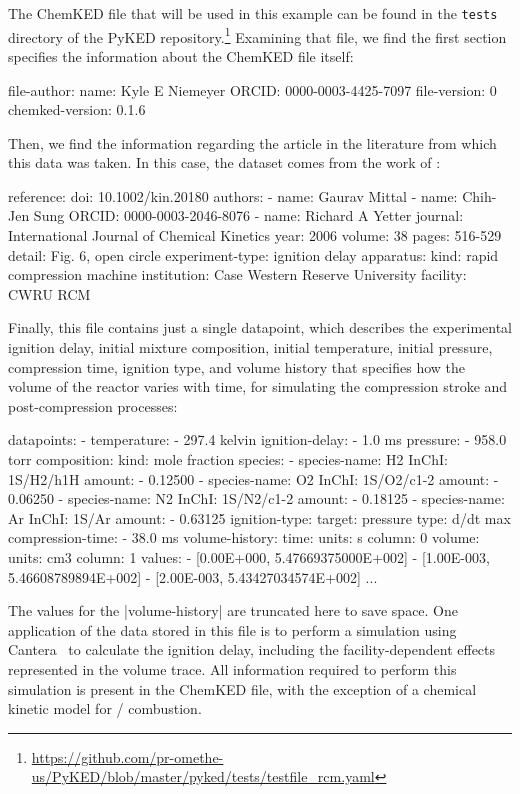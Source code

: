 \documentclass[12pt]{ijck}
\newcommand\ck{ChemKED}
\newcommand\pk{PyKED}
\begin{document}
The \ck{} file that will be used in this example can be found in the
\texttt{tests} directory of the \pk{}
repository.\footnote{\url{https://github.com/pr-omethe-us/PyKED/blob/master/pyked/tests/testfile_rcm.yaml}}
Examining that file, we find the first section specifies the information about
the \ck{} file itself:
%
\begin{yamlbox}
file-author:
  name: Kyle E Niemeyer
  ORCID: 0000-0003-4425-7097
file-version: 0
chemked-version: 0.1.6
\end{yamlbox}
%
Then, we find the information regarding the article in the literature from which
this data was taken. In this case, the dataset comes from the work of
\textcite{Mittal2006a}:
\begin{yamlbox}
reference:
  doi: 10.1002/kin.20180
  authors:
    - name: Gaurav Mittal
    - name: Chih-Jen Sung
      ORCID: 0000-0003-2046-8076
    - name: Richard A Yetter
  journal: International Journal of Chemical Kinetics
  year: 2006
  volume: 38
  pages: 516-529
  detail: Fig. 6, open circle
experiment-type: ignition delay
apparatus:
  kind: rapid compression machine
  institution: Case Western Reserve University
  facility: CWRU RCM
\end{yamlbox}
%
Finally, this file contains just a single datapoint, which describes the experimental
ignition delay, initial mixture composition, initial temperature, initial pressure,
compression time, ignition type, and volume history that specifies
how the volume of the reactor varies with time, for simulating the compression
stroke and post-compression processes:
%
\begin{yamlbox}
datapoints:
- temperature:
    - 297.4 kelvin
  ignition-delay:
    - 1.0 ms
  pressure:
    - 958.0 torr
  composition:
    kind: mole fraction
    species:
      - species-name: H2
        InChI: 1S/H2/h1H
        amount:
          - 0.12500
      - species-name: O2
        InChI: 1S/O2/c1-2
        amount:
          - 0.06250
      - species-name: N2
        InChI: 1S/N2/c1-2
        amount:
          - 0.18125
      - species-name: Ar
        InChI: 1S/Ar
        amount:
          - 0.63125
  ignition-type:
    target: pressure
    type: d/dt max
  compression-time:
    - 38.0 ms
  volume-history:
    time:
      units: s
      column: 0
    volume:
      units: cm3
      column: 1
    values:
      - [0.00E+000, 5.47669375000E+002]
      - [1.00E-003, 5.46608789894E+002]
      - [2.00E-003, 5.43427034574E+002]
      ...
\end{yamlbox}
%
The values for the \yabox|volume-history| are truncated here to save space. One application of the
data stored in this file is to perform a simulation using Cantera~\autocite{Cantera:2.3.0} to
calculate the ignition delay, including the facility-dependent effects represented in the volume
trace. All information required to perform this simulation is present in the \ck{} file, with the
exception of a chemical kinetic model for \slash {} combustion.
\end{document}
